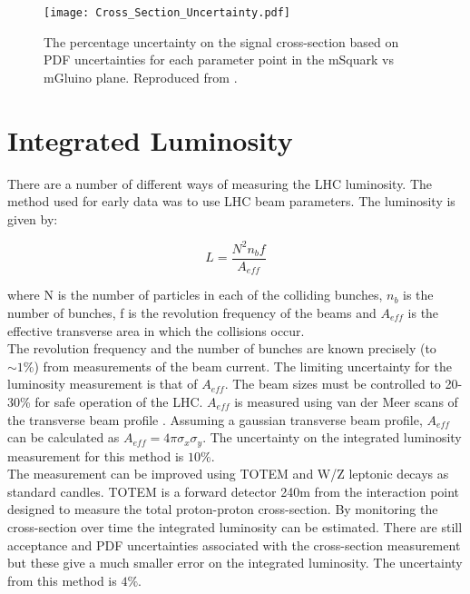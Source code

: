 \begin{figure}
\begin{center}
\texttt{[image: Cross\_Section\_Uncertainty.pdf]}
\end{center}
\caption{The percentage uncertainty on the signal cross-section based on PDF
uncertainties for each parameter point in the mSquark vs mGluino plane. 
Reproduced from \cite{ra3}.}
\label{fig:xsec_unc}
\end{figure}

\section{Integrated Luminosity}

There are a number of different ways of measuring the LHC luminosity. The method
used for early data was to use LHC beam parameters. The luminosity is given by:

\begin{equation}
L = \frac{N^{2}n_{b}f}{A_{eff}}
\label{eq:lumi}
\end{equation}

where N is the number of particles in each of the colliding bunches, $n_{b}$ is
the number of bunches, f is the revolution frequency of the beams and $A_{eff}$
is the effective transverse area in which the collisions occur. \\

The revolution frequency and the number of bunches are known precisely (to $\sim
1\%$) from measurements of the beam current. The limiting uncertainty for the
luminosity measurement is that of $A_{eff}$. The beam sizes must be controlled 
to 20-30\% for safe operation of the LHC. $A_{eff}$ is measured using van der 
Meer scans of the transverse beam profile \cite{vdm_scans}. Assuming a gaussian
transverse beam profile, $A_{eff}$ can be calculated as $A_{eff} = 
4\pi\sigma_{x}\sigma_{y}$. The uncertainty on the integrated luminosity 
measurement for this method is $10\%$. \\

The measurement can be improved using TOTEM and W/Z leptonic decays as standard
candles. TOTEM is a forward detector 240m from the interaction point designed to
measure the total proton-proton cross-section. By monitoring the cross-section
over time the integrated luminosity can be estimated. There are still acceptance
and PDF uncertainties associated with the cross-section measurement but these 
give a much smaller error on the integrated luminosity. The uncertainty from
this method is $4\%$.

